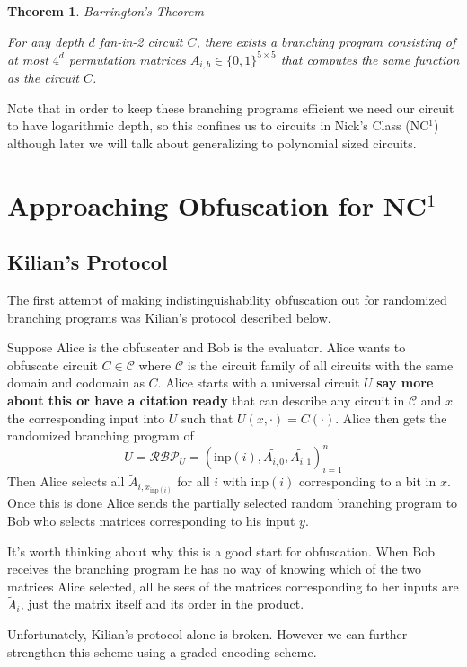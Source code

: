 \documentclass[12pt,twoside]{reedthesis}
\newtheorem{theorem}{Theorem}
\begin{document}
      
      \begin{theorem}{Barrington's Theorem}
      \par For any depth $d$ fan-in-2 circuit $C$, there exists a branching program consisting of at most $4^d$ permutation matrices $A_{i,b}\in\{0,1\}^{5 \times 5}$ that computes the same function as the circuit $C$.
      \end{theorem}
      
      
     \par Note that in order to keep these branching programs efficient we need our circuit to have logarithmic depth, so this confines us to circuits in Nick's Class (NC$^1$) although later we will talk about generalizing to polynomial sized circuits. 
     
     \section{Approaching Obfuscation for NC$^1$}
     \newcommand{\inp}[0]{\text{inp}}
     
     \subsection{Kilian's Protocol}
     The first attempt of making indistinguishability obfuscation out for randomized branching programs was Kilian's protocol described below. 
     \par Suppose Alice is the obfuscater and Bob is the evaluator. Alice wants to obfuscate circuit $C\in \mathcal{C}$ where $\mathcal{C}$ is the circuit family of all circuits with the same domain and codomain as $C$. Alice starts with a universal circuit $U$ \textbf{say more about this or have a citation ready} that can describe any circuit in $\mathcal{C}$ and $x$ the corresponding input into $U$ such that $U(x,\cdot) = C(\cdot)$. Alice then gets the randomized branching program of 
     $$U = \mathcal{RBP}_U = (\inp(i),\tilde{A_{i,0}},\tilde{A_{i,1}})_{i=1}^n$$
     Then Alice selects all $\tilde{A}_{i,x_{\inp(i)}}$ for all $i$ with $\inp(i)$ corresponding to a bit in $x$. Once this is done Alice sends the partially selected random branching program to Bob who selects matrices corresponding to his input $y$. 
     \par It's worth thinking about why this is a good start for obfuscation. When Bob receives the branching program he has no way of knowing which of the two matrices Alice selected, all he sees of the matrices corresponding to her inputs are $\tilde{A}_i$, just the matrix itself and its order in the product.
     \par Unfortunately, Kilian's protocol alone is broken. However we can further strengthen this scheme using a graded encoding scheme. 
    
\end{document}
